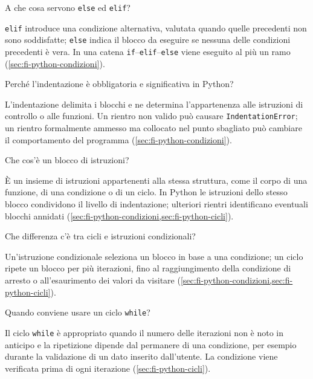 \begin{exercise}
\label{ex:fi-python-else-elif}
A che cosa servono \texttt{else} ed \texttt{elif}?
\end{exercise}

\texttt{elif} introduce una condizione alternativa, valutata quando
quelle precedenti non sono soddisfatte; \texttt{else} indica il
blocco da eseguire se nessuna delle condizioni precedenti è vera.
In una catena \texttt{if}--\texttt{elif}--\texttt{else} viene eseguito
al più un ramo (\cref{sec:fi-python-condizioni}).

\begin{exercise}
\label{ex:fi-python-indentazione}
Perché l'indentazione è obbligatoria e significativa in Python?
\end{exercise}

L'indentazione delimita i blocchi e ne determina l'appartenenza
alle istruzioni di controllo o alle funzioni. Un rientro non valido
può causare \texttt{IndentationError}; un rientro formalmente
ammesso ma collocato nel punto sbagliato può cambiare il comportamento
del programma (\cref{sec:fi-python-condizioni}).

\begin{exercise}
\label{ex:fi-python-blocco-istruzioni}
Che cos'è un blocco di istruzioni?
\end{exercise}

È un insieme di istruzioni appartenenti alla stessa struttura,
come il corpo di una funzione, di una condizione o di un ciclo.
In Python le istruzioni dello stesso blocco condividono il livello
di indentazione; ulteriori rientri identificano eventuali blocchi
annidati (\cref{sec:fi-python-condizioni,sec:fi-python-cicli}).

\begin{exercise}
\label{ex:fi-python-cicli-condizionali}
Che differenza c'è tra cicli e istruzioni condizionali?
\end{exercise}

Un'istruzione condizionale seleziona un blocco in base a una
condizione; un ciclo ripete un blocco per più iterazioni, fino al
raggiungimento della condizione di arresto o all'esaurimento dei
valori da visitare (\cref{sec:fi-python-condizioni,sec:fi-python-cicli}).

\begin{exercise}
\label{ex:fi-python-quando-while}
Quando conviene usare un ciclo \texttt{while}?
\end{exercise}

Il ciclo \texttt{while} è appropriato quando il numero delle
iterazioni non è noto in anticipo e la ripetizione dipende dal
permanere di una condizione, per esempio durante la validazione
di un dato inserito dall'utente. La condizione viene verificata
prima di ogni iterazione (\cref{sec:fi-python-cicli}).

